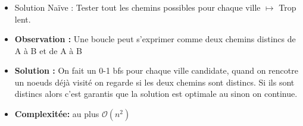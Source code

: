 \begin{frame}
    \frametitle{\problemtitle}
    \begin{itemize}
        \begin{block}{Problème}
            Un graphe avec $n$ villes et $m$ villes candidates, trouver la ville candidate dont le cycle est le plus petit.
        \end{block}
        \item<+-> Solution Naïve : Tester tout les chemins possibles pour chaque ville $\mapsto$ Trop lent.
        \item<+-> \textbf{Observation :} Une boucle peut s'exprimer comme deux chemins distincs de A à B et de A à B
        \item<+-> \textbf{Solution :} On fait un 0-1 bfs pour chaque ville candidate, quand on rencotre un noeuds déjà visité on regarde si les deux chemins sont distincs. Si ils sont distincs alors c'est garantis que la solution est optimale au sinon on continue.
        \item<+-> \textbf{Complexitée: } au plus $\mathcal{O}(n^2)$
    \end{itemize}
    \solvestats
\end{frame}
